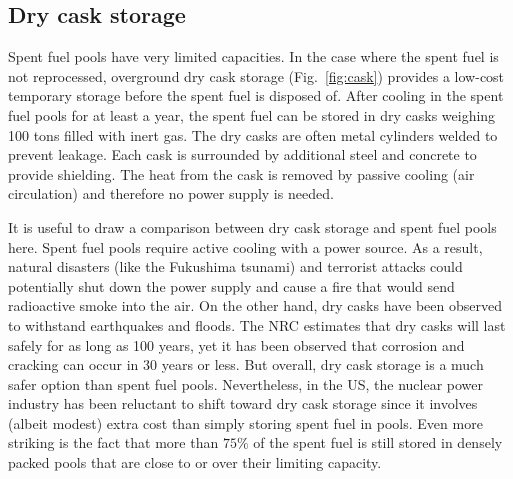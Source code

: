 \documentclass[nofootinbib,preprint,aps]{revtex4-1}
\begin{document}
    \subsection{Dry cask storage}
    Spent fuel pools have very limited capacities. 
    In the case where the spent fuel is not reprocessed, overground dry cask storage (Fig.~\ref{fig:cask}) provides a low-cost temporary storage before the spent fuel is disposed of.
    After cooling in the spent fuel pools for at least a year, the spent fuel can be stored in dry casks weighing
    100 tons filled with inert gas. 
    The dry casks are often metal cylinders welded to prevent leakage. Each cask is surrounded by
    additional steel and concrete to provide shielding.
    The heat from the cask is removed by passive
    cooling (air circulation) and therefore no power supply is needed.

    It is useful to draw a comparison between dry cask storage and spent fuel pools here.
    Spent fuel pools require active cooling with a power source. As a result, natural disasters (like the Fukushima
    tsunami) and terrorist attacks could potentially shut down the power supply and cause a fire that would
    send radioactive smoke into the air.
    On the other hand, dry casks have been observed to withstand earthquakes and floods.
    The NRC estimates that dry casks will
    last safely for as long as 100 years, yet it has been observed that corrosion and cracking can occur in 30 years
    or less.\cite{aa12} But overall, dry cask storage is a much safer option than spent fuel pools.\cite{r14} Nevertheless, in the US, the nuclear power industry has been reluctant to shift toward dry cask storage since it
    involves (albeit modest) extra cost than simply storing spent fuel in pools.\cite{r14}
    Even more striking is the fact that more than $75\%$ of the spent fuel is still stored in densely
    packed pools
    that are close to or over their limiting capacity.\cite{a11,aa12}
\end{document}
